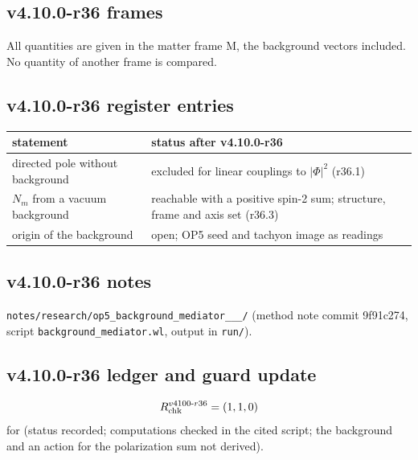 \subsection*{v4.10.0-r36 frames}
\label{subsec:v4100-r36-frames}

All quantities are given in the matter frame M, the background vectors included.  No quantity of another frame is compared.

\subsection*{v4.10.0-r36 register entries}
\label{subsec:v4100-r36-register}

\begin{center}
\small
\begin{tabular}{@{}>{\raggedright\arraybackslash}p{}>{\raggedright\arraybackslash}p{}@{}}
\toprule
statement & status after v4.10.0-r36\\
\midrule
directed pole without background & excluded for linear couplings to \(|\Phi|^2\) (r36.1)\\
\(N_m\) from a vacuum background & reachable with a positive spin-2 sum; structure, frame and axis set (r36.3)\\
origin of the background & open; OP5 seed and tachyon image as readings\\
\bottomrule
\end{tabular}
\end{center}

\subsection*{v4.10.0-r36 notes}
\label{subsec:v4100-r36-notes}

\texttt{notes/\allowbreak research/\allowbreak op5\_\allowbreak background\_\allowbreak mediator\_\_\_/} (method note commit 9f91c274,
script \texttt{background\_\allowbreak mediator.wl}, output in \texttt{run/}).

\subsection*{v4.10.0-r36 ledger and guard update}
\label{subsec:v4100-r36-ledger-guard}

\[
R_{\rm chk}^{v4100\text{-}r36}=(1,1,0)
\]
for (status recorded; computations checked in the cited script; the background and an action for the polarization sum not derived).

